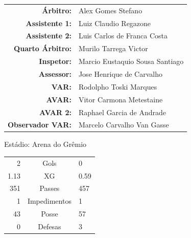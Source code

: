 \documentclass[11pt]{article}
\begin{document}
\vspace{0.5cm}
\begin{minipage}{0.65\textwidth}
\begin{center}
\begin{tabular}{rl}
\textbf{Árbitro:} & Alex Gomes Stefano \\
\textbf{Assistente 1:} & Luiz Claudio Regazone \\
\textbf{Assistente 2:} & Luis Carlos de Franca Costa \\
\textbf{Quarto Árbitro:} & Murilo Tarrega Victor \\
\textbf{Inspetor:} & Marcio Eustaquio Sousa Santiago \\
\textbf{Assessor:} & Jose Henrique de Carvalho \\
\textbf{VAR:} & Rodolpho Toski Marques \\
\textbf{AVAR:} & Vitor Carmona Metestaine \\
\textbf{AVAR 2:} & Raphael Garcia de Andrade \\
\textbf{Observador VAR:} & Marcelo Carvalho Van Gasse \\
\end{tabular}
\end{center}
\end{minipage}
\begin{minipage}{0.3\textwidth}
Estádio: Arena do Grêmio\\
\begin{tabular}{rcl}
2 & Gols & 0 \\
1.13 & XG & 0.59 \\
351 & Passes & 457 \\
1 & Impedimentos & 1 \\
43 & Posse & 57 \\
0 & Defesas & 3 \\
\end{tabular}
\end{minipage}
\newpage
\end{document}
